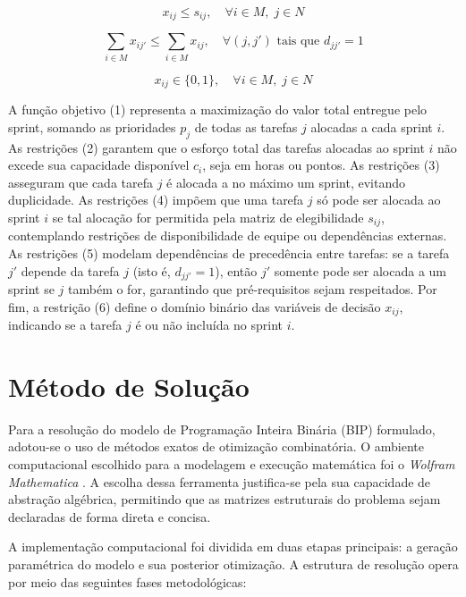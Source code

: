 \documentclass[12pt]{article}
\begin{document}
\begin{equation}
x_{ij} \le s_{ij},
\quad \forall i \in M,\; j \in N
\end{equation}

\begin{equation}
\sum_{i \in M} x_{ij'}
\le
\sum_{i \in M} x_{ij},
\quad \forall (j,j') \text{ tais que } d_{jj'} = 1
\end{equation}

\begin{equation}
x_{ij} \in \{0,1\},
\quad \forall i \in M,\; j \in N
\end{equation}

A função objetivo (1) representa a maximização do valor total entregue pelo sprint, somando as prioridades $p_j$ de todas as tarefas $j$ alocadas a cada sprint $i$. As restrições (2) garantem que o esforço total das tarefas alocadas ao sprint $i$ não excede sua capacidade disponível $c_i$, seja em horas ou pontos. As restrições (3) asseguram que cada tarefa $j$ é alocada a no máximo um sprint, evitando duplicidade. As restrições (4) impõem que uma tarefa $j$ só pode ser alocada ao sprint $i$ se tal alocação for permitida pela matriz de elegibilidade $s_{ij}$, contemplando restrições de disponibilidade de equipe ou dependências externas. As restrições (5) modelam dependências de precedência entre tarefas: se a tarefa $j'$ depende da tarefa $j$ (isto é, $d_{jj'} = 1$), então $j'$ somente pode ser alocada a um sprint se $j$ também o for, garantindo que pré-requisitos sejam respeitados. Por fim, a restrição (6) define o domínio binário das variáveis de decisão $x_{ij}$, indicando se a tarefa $j$ é ou não incluída no sprint $i$.



\section{Método de Solução}

Para a resolução do modelo de Programação Inteira Binária (BIP) formulado, adotou-se o uso de métodos exatos de otimização combinatória. O ambiente computacional escolhido para a modelagem e execução matemática foi o \textit{Wolfram Mathematica} \cite{wolfram_mathematica_2026}. A escolha dessa ferramenta justifica-se pela sua capacidade de abstração algébrica, permitindo que as matrizes estruturais do problema sejam declaradas de forma direta e concisa.

A implementação computacional foi dividida em duas etapas principais: a geração paramétrica do modelo e sua posterior otimização. A estrutura de resolução opera por meio das seguintes fases metodológicas:
\end{document}
